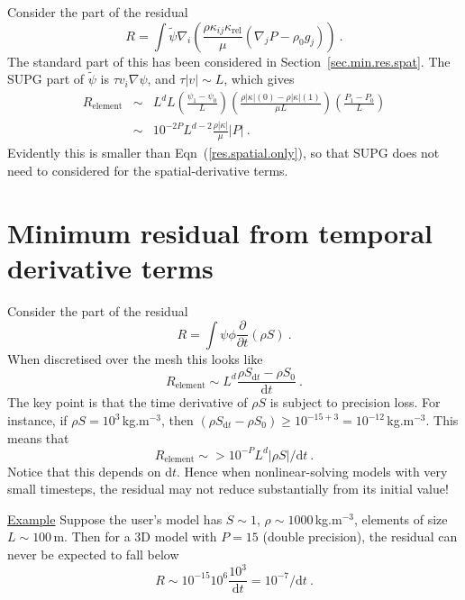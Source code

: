 \documentclass[]{scrreprt}
\begin{document}
Consider the part of the residual
\begin{equation}
R = \int \tilde{\psi} \nabla_{i}
\left( \frac{\rho \kappa_{ij}\kappa_{\mathrm{rel}}}{\mu} (\nabla_{j}P
- \rho_{0} g_{j}) \right) \ .
\end{equation}
The standard part of this has been considered in
Section~\ref{sec.min.res.spat}.  The SUPG part of $\tilde{\psi}$ is
$\tau v_{i}\nabla\psi$, and $\tau |v|\sim L$, which gives
\begin{eqnarray}
R_{\mathrm{element}} & \sim & L^{d} L \left(\frac{\psi_{1}-\psi_{0}}{L}\right)
\left( \frac{\rho|\kappa|(0) - \rho|\kappa|(1)}{\mu L}\right)
\left(\frac{P_{1}-P_{0}}{L}\right)
\nonumber \\
& \sim & 10^{-2P} L^{d-2} \frac{\rho|\kappa|}{\mu}|P|
\ .
\end{eqnarray}
Evidently this is smaller than Eqn~(\ref{res.spatial.only}), so that
SUPG does not need to considered for the spatial-derivative terms.


\section{Minimum residual from temporal derivative terms}
\label{min.res.sec.temp}

Consider the part of the residual
\begin{equation}
R = \int \psi \phi \frac{\partial}{\partial t} \left( \rho S \right)
\ .
\end{equation}
When discretised over the mesh this looks like
\begin{equation}
R_{\mathrm{element}} \sim L^{d} \frac{\rho S_{\mathrm{d}t} - \rho
  S_{0}}{\mathrm{d}t} \ .
\end{equation}
The key point is that the time derivative of $\rho S$ is
subject to precision loss.  For instance, if $\rho S =
10^{3}$\,kg.m$^{-3}$, then $(\rho S_{\mathrm{d}t} - \rho S_{0}) \geq
10^{-15+3} = 10^{-12}$\,kg.m$^{-3}$.  This means that
\begin{equation}
R_{\mathrm{element}} \sim> 10^{-P}L^{d}{|\rho S|}/{\mathrm{d}t} \ .
\end{equation}
Notice that this depends on d$t$.  Hence when nonlinear-solving models
with very small timesteps, the residual may not reduce substantially
from its initial value!

{\underline{Example}}  Suppose the user's model has $S\sim 1$,
$\rho\sim 1000$\,kg.m$^{-3}$, elements of size $L\sim 100$\,m.  Then
for a 3D model with $P=15$ (double precision), the residual can never be expected to
fall below
\begin{equation}
R \sim 10^{-15}10^{6}\frac{10^{3}}{\mathrm{d}t} = 10^{-7}/{\mathrm{d}t}
  \ .
\end{equation}
\end{document}
